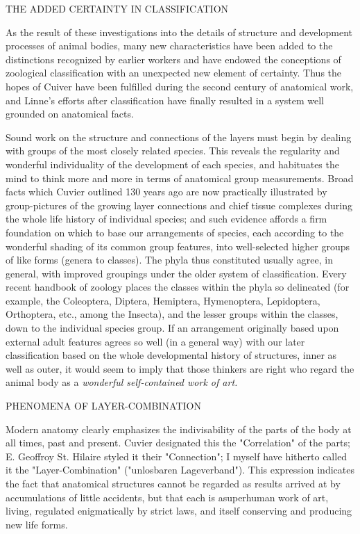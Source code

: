 THE ADDED CERTAINTY IN CLASSIFICATION

As the result of these investigations into the details of structure and development processes of
animal bodies, many new characteristics have been added to the distinctions recognized by
earlier workers and have endowed the conceptions of zoological classification with an
unexpected new element of certainty. Thus the hopes of Cuiver have been fulfilled during the
second century of anatomical work, and Linne's efforts after classification have finally
resulted in a system well grounded on anatomical facts.

Sound work on the structure and connections of the layers must begin by dealing with groups
of the most closely related species. This reveals the regularity and wonderful individuality of
the development of each species, and habituates the mind to think more and more in terms of
anatomical group measurements. Broad facts which Cuvier outlined 130 years ago are now
practically illustrated by group-pictures of the growing layer connections and chief tissue
complexes during the whole life history of individual species; and such evidence affords a
firm foundation on which to base our arrangements of species, each according to the
wonderful shading of its common group features, into well-selected higher groups of like
forms (genera to classes). The phyla thus constituted usually agree, in general, with improved
groupings under the older system of classification. Every recent handbook of zoology places
the classes within the phyla so delineated (for example, the Coleoptera, Diptera, Hemiptera,
Hymenoptera, Lepidoptera, Orthoptera, etc., among the Insecta), and the lesser groups within
the classes, down to the individual species group. If an arrangement originally based upon
external adult features agrees so well (in a general way) with our later classification based on
the whole developmental history of structures, inner as well as outer, it would seem to imply
that those thinkers are right who regard the animal body as a \textit{wonderful self-contained work
of art.}

PHENOMENA OF LAYER-COMBINATION

Modern anatomy clearly emphasizes the indivisability of the parts of the body at all times,
past and present. Cuvier designated this the "Correlation" of the parts; E. Geoffroy St. Hilaire
styled it their "Connection"; I myself have hitherto called it the "Layer-Combination"
("unlosbaren Lageverband"). This expression indicates the fact that anatomical structures
cannot be regarded as results arrived at by accumulations of little accidents, but that each is asuperhuman work of art, living, regulated enigmatically by strict laws, and itself conserving
and producing new life forms.

